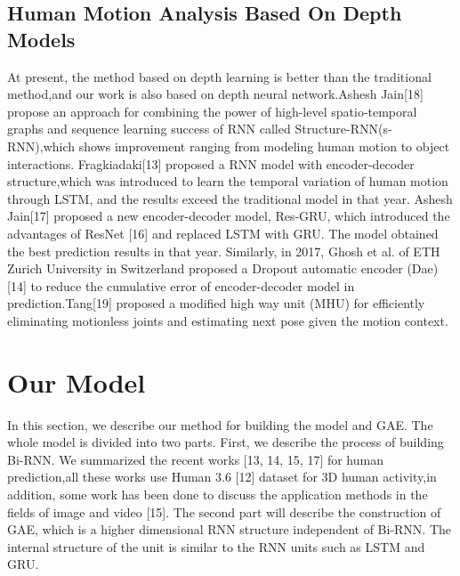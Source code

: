 \documentclass[conference]{IEEEtran}
\begin{document}
\subsection{Human Motion Analysis Based On Depth Models}
At present, the method based on depth learning is better than the traditional method,and our work is also based on depth neural network.Ashesh Jain[18] propose an approach for combining the power of high-level spatio-temporal graphs and sequence learning success of RNN called Structure-RNN(s-RNN),which shows improvement ranging from modeling human motion to object interactions. Fragkiadaki[13] proposed a RNN model with encoder-decoder structure,which was introduced to learn the temporal variation of human motion through LSTM, and the results exceed the traditional model in that year. Ashesh Jain[17] proposed a new encoder-decoder model, Res-GRU, which introduced the advantages of ResNet [16] and replaced LSTM with GRU. The model obtained the best prediction results in that year. Similarly, in 2017, Ghosh et al. of ETH Zurich University in Switzerland proposed a Dropout automatic encoder (Dae) [14] to reduce the cumulative error of encoder-decoder model in prediction.Tang[19] proposed a modified high way unit (MHU) for efficiently eliminating motionless joints and estimating next pose given the motion context.

\section{Our Model}
In this section, we describe our method for building the model and GAE. The whole model is divided into two parts. First, we describe the process of building Bi-RNN. We summarized the recent works [13, 14, 15, 17] for human prediction,all these works use Human 3.6 [12] dataset for 3D human activity,in addition, some work has been done to discuss the application methods in the fields of image and video [15]. The second part will describe the construction of GAE, which is a higher dimensional RNN structure independent of Bi-RNN. The internal structure of the unit is similar to the RNN units such as LSTM and GRU.
\end{document}
